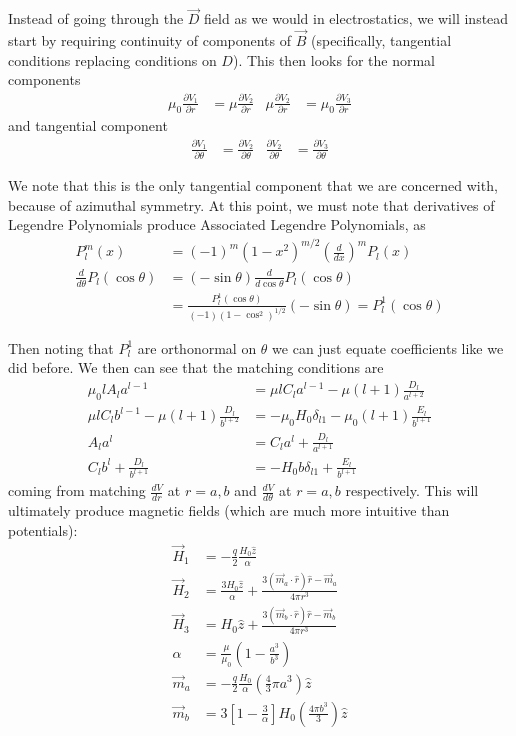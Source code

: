 \documentclass[10pt]{report}
\newcommand{\rd}[2]{\frac{d#1}{d#2}}
\newcommand{\pd}[2]{\frac{\partial #1}{\partial#2}}
\begin{document}
Instead of going through the $\vec{D}$ field as we would in electrostatics, we will instead start by requiring continuity of components of $\vec{B}$ (specifically, tangential conditions replacing conditions on $D$). This then looks for the normal components
\begin{align}
    \mu_0 \pd{V_1}{r} &= \mu \pd{V_2}{r} & \mu\pd{V_2}{r} &= \mu_0\pd{V_3}{r}
\end{align}
and tangential component
\begin{align}
    \pd{V_1}{\theta} &= \pd{V_2}{\theta} & \pd{V_2}{\theta} &= \pd{V_3}{\theta}
\end{align}

We note that this is the only tangential component that we are concerned with, because of azimuthal symmetry. At this point, we must note that derivatives of Legendre Polynomials produce Associated Legendre Polynomials, as
\begin{align}
    P_l^m(x) &= \left( -1 \right)^m(1-x^2)^{m/2}\left( \rd{}{x} \right)^mP_l(x)\\
    \rd{}{\theta}P_l(\cos\theta) &= (-\sin\theta)\rd{}{\cos\theta}P_l(\cos\theta)\\
    &= \frac{P_l^1(\cos\theta)}{(-1)(1-\cos^2)^{1/2}}(-\sin\theta) = P_l^1(\cos\theta)
\end{align}

Then noting that $P_l^1$ are orthonormal on $\theta$ we can just equate coefficients like we did before. We then can see that the matching conditions are
\begin{align}
    \mu_0lA_la^{l-1} &= \mu lC_la^{l-1} - \mu(l+1)\frac{D_l}{a^{l+2}}\\
    \mu l C_l b^{l-1} - \mu(l+1)\frac{D_l}{b^{l+2}} &= -\mu_0 H_0 \delta_{l1} - \mu_0 (l+1)\frac{E_l}{b^{l+1}}\\
    A_l a^l &= C_la^l + \frac{D_l}{a^{l+1}}\\
    C_lb^l + \frac{D_l}{b^{l+1}} &= -H_0b\delta_{l1} + \frac{E_l}{b^{l+1}}
\end{align}
coming from matching $\rd{V}{r}$ at $r=a,b$ and $\rd{V}{\theta}$ at $r=a,b$ respectively. This will ultimately produce magnetic fields (which are much more intuitive than potentials):
\begin{align}
    \vec{H}_1 &= -\frac{q}{2}\frac{H_0\hat{z}}{\alpha}\\
    \vec{H}_2 &= \frac{3H_0\hat{z}}{\alpha} + \frac{3(\vec{m}_a\cdot \hat{r})\hat{r} - \vec{m}_a}{4\pi r^3}\\
    \vec{H}_3 &= H_0\hat{z} + \frac{3(\vec{m}_b\cdot \hat{r})\hat{r} - \vec{m}_b}{4\pi r^3}\\
    \alpha &= \frac{\mu}{\mu_0}\left( 1 - \frac{a^3}{b^3} \right)\\
    \vec{m}_a &= -\frac{q}{2}\frac{H_0}{\alpha}(\frac{4}{3}\pi a^3)\hat{z}\\
    \vec{m}_b &= 3\left[ 1 - \frac{3}{\alpha} \right]H_0\left(\frac{4 \pi b^3}{3}\right)\hat{z}
\end{align}
\end{document}
